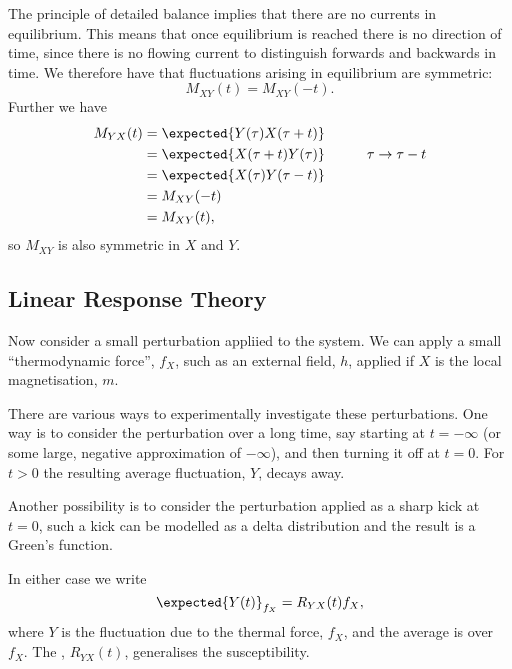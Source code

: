 \documentclass[fleqn]{NotesClass}
\begin{document}
    The principle of detailed balance implies that there are no currents in equilibrium.
    This means that once equilibrium is reached there is no direction of time, since there is no flowing current to distinguish forwards and backwards in time.
    We therefore have that fluctuations arising in equilibrium are symmetric:
    \begin{equation}
        M_{XY}(t) = M_{XY}(-t).
    \end{equation}
    Further we have
    \begin{alignat}{3}
        M_{YX}(t) &= \expected{Y(\tau) X(\tau + t)}\\
        &= \expected{X(\tau + t)Y(\tau)} \qquad & \tau \to \tau - t\\
        &= \expected{X(\tau)Y(\tau - t)}\\
        &= M_{XY}(-t)\\
        &= M_{XY}(t),
    \end{alignat}
    so \(M_{XY}\) is also symmetric in \(X\) and \(Y\).
    
    \subsection{Linear Response Theory}
    Now consider a small perturbation appliied to the system.
    We can apply a small \enquote{thermodynamic force}, \(f_X\), such as an external field, \(h\), applied if \(X\) is the local magnetisation, \(m\).
    
    There are various ways to experimentally investigate these perturbations.
    One way is to consider the perturbation over a long time, say starting at \(t = -\infty\) (or some large, negative approximation of \(-\infty\)), and then turning it off at \(t = 0\).
    For \(t > 0\) the resulting average fluctuation, \(Y\), decays away.
    
    Another possibility is to consider the perturbation applied as a sharp kick at \(t = 0\), such a kick can be modelled as a delta distribution and the result is a Green's function.
    
    In either case we write
    \begin{equation}
        \expected{Y(t)}_{f_X} = R_{YX}(t) f_X,
    \end{equation}
    where \(Y\) is the fluctuation due to the thermal force, \(f_X\), and the average is over \(f_X\).
    The , \(R_{YX}(t)\), generalises the susceptibility.
    
\end{document}
